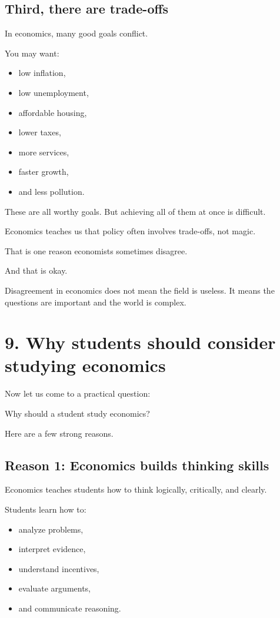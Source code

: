 \documentclass[12pt]{article}
\begin{document}
\subsection*{Third, there are trade-offs}

In economics, many good goals conflict.

You may want:
\begin{itemize}[leftmargin=2em]
    \item low inflation,
    \item low unemployment,
    \item affordable housing,
    \item lower taxes,
    \item more services,
    \item faster growth,
    \item and less pollution.
\end{itemize}

These are all worthy goals.  
But achieving all of them at once is difficult.

Economics teaches us that policy often involves trade-offs, not magic.

That is one reason economists sometimes disagree.

And that is okay.

Disagreement in economics does not mean the field is useless.  
It means the questions are important and the world is complex.

\section*{9. Why students should consider studying economics}

Now let us come to a practical question:

Why should a student study economics?

Here are a few strong reasons.

\subsection*{Reason 1: Economics builds thinking skills}

Economics teaches students how to think logically, critically, and clearly.

Students learn how to:
\begin{itemize}[leftmargin=2em]
    \item analyze problems,
    \item interpret evidence,
    \item understand incentives,
    \item evaluate arguments,
    \item and communicate reasoning.
\end{itemize}
\end{document}
